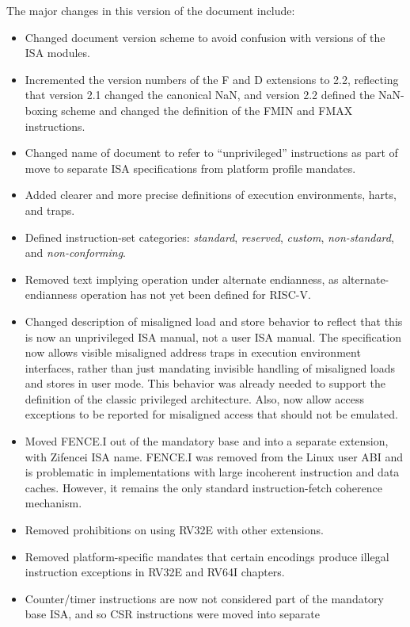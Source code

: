 The major changes in this version of the document include:
\begin{itemize}
\parskip 0pt
\itemsep 1pt
\item Changed document version scheme to avoid confusion with versions
  of the ISA modules.
\item Incremented the version numbers of the F and D extensions to 2.2,
  reflecting that version 2.1 changed the canonical NaN, and version
  2.2 defined the NaN-boxing scheme and changed the definition of the
  FMIN and FMAX instructions.
\item Changed name of document to refer to ``unprivileged''
  instructions as part of move to separate ISA specifications from
  platform profile mandates.
\item Added clearer and more precise definitions of execution
  environments, harts, and traps.
\item Defined instruction-set categories: {\em standard}, {\em
  reserved}, {\em custom}, {\em non-standard}, and {\em
  non-conforming}.
\item Removed text implying operation under alternate endianness, as
  alternate-endianness operation has not yet been defined for RISC-V.
\item Changed description of misaligned load and store behavior to
  reflect that this is now an unprivileged ISA manual, not a user
  ISA manual.  The specification now allows visible misaligned address
  traps in execution environment interfaces, rather than just mandating
  invisible handling of misaligned loads and stores in user mode.
  This behavior was already needed to support the definition of the
  classic privileged architecture.  Also, now allow access exceptions
  to be reported for misaligned access that should not be emulated.
\item Moved FENCE.I out of the mandatory base and into a separate extension,
  with Zifencei ISA name.  FENCE.I was removed from the Linux user ABI and is
  problematic in implementations with large incoherent instruction and
  data caches.  However, it remains the only standard
  instruction-fetch coherence mechanism.
\item Removed prohibitions on using RV32E with other extensions.
\item Removed platform-specific mandates that certain encodings
  produce illegal instruction exceptions in RV32E and RV64I chapters.
\item Counter/timer instructions are now not considered part of the
  mandatory base ISA, and so CSR instructions were moved into separate

\end{itemize}
